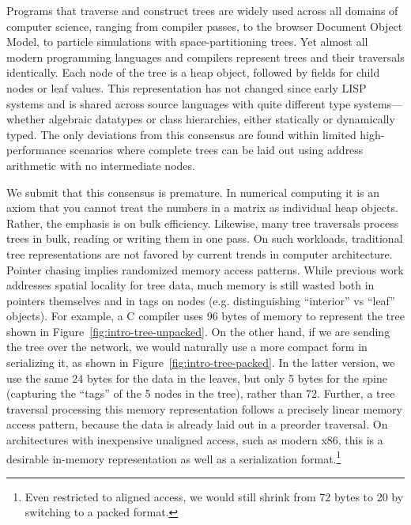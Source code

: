 \documentclass[a4paper,english]{lipics-v2016}
\begin{document}
Programs that traverse and construct trees are widely used across all
domains of computer science, ranging from compiler passes, to the
browser Document Object Model, to particle simulations with
space-partitioning trees.
%
Yet almost all modern programming languages and
compilers represent trees and their traversals identically.
Each node of the tree is a heap object, followed by fields for child nodes or
leaf values.  This representation has not changed since early LISP systems and
is shared across source languages with quite different type
systems---whether algebraic datatypes or class hierarchies, either statically or
dynamically typed.  The only deviations from this consensus are found within
limited high-performance scenarios where complete trees can be laid out using
address arithmetic with no intermediate nodes.

We submit that this consensus is premature.  In numerical computing it is an axiom
that you cannot treat the numbers in a matrix as individual heap objects.
Rather, the emphasis is on bulk efficiency.  Likewise, many tree traversals
process trees in bulk, reading or writing them in one pass.  On such workloads,
traditional tree representations are not favored by current trends in computer
architecture.  Pointer chasing implies randomized memory access patterns.
%
While previous work addresses spatial locality for tree data\cite{Chilimbi1999},
%
much memory is still wasted both in pointers themselves and in tags on nodes
(e.g. distinguishing ``interior'' vs ``leaf'' objects).  For example, a C
compiler uses 96 bytes
%
%
of memory to represent the tree shown in
Figure~\ref{fig:intro-tree-unpacked}. On the other hand, if we are
sending the tree over the network, we would naturally use a more
compact form in serializing it, as shown in
Figure~\ref{fig:intro-tree-packed}.  In the latter version, we use the
same 24 bytes for the data in the leaves, but only 5 bytes for the
spine (capturing the ``tags'' of the 5 nodes in the tree), rather than
72.  Further, a tree traversal processing this memory representation
follows a precisely linear memory access pattern, because the data is
already laid out in a preorder traversal.
%
On architectures with inexpensive unaligned access, such as modern
x86, this is a desirable in-memory representation as well as a
serialization format.\footnote{Even restricted to aligned access, we
  would still shrink from 72 bytes to 20 by switching to a packed
  format.}
\end{document}
